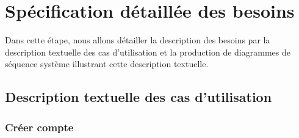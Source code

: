 \section[Spécification détaillée des besoins]{Spécification détaillée des besoins}
Dans cette étape, nous allons détailler la description des besoins par la description textuelle
des cas d’utilisation et la production de diagrammes de séquence système
illustrant cette description textuelle. \cite*{audibert2008uml}  
    \subsection[Description textuelle des cas d'utilisation]{Description textuelle des cas d’utilisation}
        \subsubsection[Créer compte]{Créer compte}
